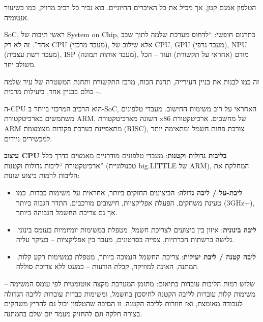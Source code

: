 


הטלפון אמנם קטן, אך מכיל את כל האיברים החיוניים. בוא נכיר כל רכיב מדויק, כמו בשיעור אנטומיה.


SoC, ראשי תיבות של System on Chip, בתרגום חופשי: “לדחוס מערכת שלמה לתוך שבב אחד”. זה לא רק CPU (מעבד מרכזי), אלא שילוב של CPU, GPU (מעבד גרפי), NPU (מעבד רשת עצבית), ISP (מעבד אותות תמונה), מודם (אחראי על תקשורת) ועוד – הכל משולב יחד.

זה כמו לבנות את בניין העירייה, תחנת הכוח, מרכז התקשורת ותחנת המשטרה של עיר שלמה – כולם בבניין אחד, ביעילות מרבית.


ה-CPU הוא הרכיב המרכזי ביותר ב-SoC, האחראי על רוב משימות החישוב. מעבדי טלפונים משתמשים בארכיטקטורת ARM, השונה מארכיטקטורת x86 של מחשבים. ארכיטקטורת ARM מתאפיינת בערכת פקודות מצומצמת (RISC), צורכת פחות חשמל ומתאימה יותר למכשירים ניידים.

\textbf{עיצוב CPU בליבות גדולות וקטנות}: מעבדי טלפונים מודרניים מאמצים בדרך כלל ארכיטקטורת “ליבות גדולות וקטנות” (טכנולוגיית big.LITTLE של ARM), המחלקת את הליבות לרמות ביצוע שונות:

\begin{itemize}
  \item \textbf{ליבת-על / ליבה גדולה}: הביצועים החזקים ביותר, אחראית על משימות כבדות. כמו טעינת משחקים, הפעלת אפליקציות, חישובים מורכבים. התדר הגבוה ביותר (3GHz+), אך גם צריכת החשמל הגבוהה ביותר.
  \item \textbf{ליבה בינונית}: איזון בין ביצועים לצריכת חשמל, מטפלת במשימות יומיומיות בעומס בינוני. גלישה ברשתות חברתיות, צפייה בסרטונים, מעבר בין אפליקציות – בעיקר עליה.
  \item \textbf{ליבה קטנה / ליבת יעילות}: צריכת החשמל הנמוכה ביותר, מטפלת במשימות רקע קלות. המתנה, האזנה למוזיקה, קבלת הודעות – כמעט ללא צריכת סוללה.
\end{itemize}

שלוש רמות הליבות עובדות בתיאום: מתזמן המערכת מקצה אוטומטית לפי עומס המשימה – משימות קלות עוברות לליבה הקטנה לחיסכון בחשמל, ומשימות כבדות עוברות לליבה הגדולה לעבודה מאומצת, ואז חוזרות לליבה הקטנה. זו הסיבה שהטלפון יכול גם להריץ משחקים בצורה חלקה וגם להחזיק מעמד יום שלם בהמתנה.

